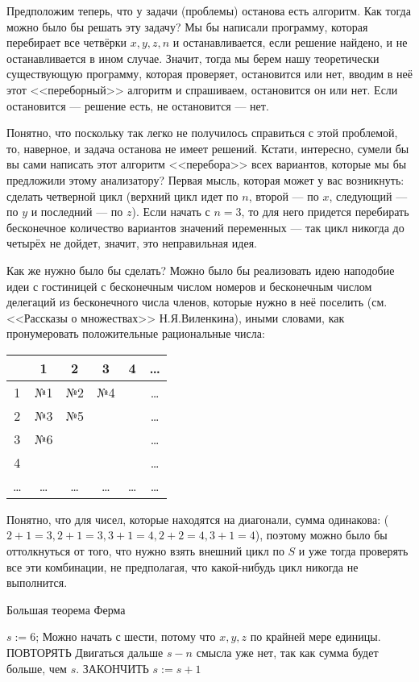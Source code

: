 \documentclass[russian]{lecture-notes}
\begin{document}
	Предположим теперь, что у задачи (проблемы) останова есть алгоритм. Как тогда можно было бы решать эту задачу? Мы бы написали программу, которая перебирает все четвёрки $x, y, z, n$ и останавливается, если решение найдено, и не останавливается в ином случае. Значит, тогда мы берем нашу теоретически существующую программу, которая проверяет, остановится или нет, вводим в неё этот <<переборный>> алгоритм и спрашиваем, остановится он или нет. Если остановится --- решение есть, не остановится --- нет. 
	
	Понятно, что поскольку так легко не получилось справиться с этой проблемой, то, наверное, и задача останова не имеет решений. Кстати, интересно, сумели бы вы сами написать этот алгоритм <<перебора>> всех вариантов, которые мы бы предложили этому анализатору? Первая мысль, которая может у вас возникнуть: сделать четверной цикл (верхний цикл идет по $n$, второй --- по $x$, следующий --- по $y$ и последний --- по $z$). Если начать с $n = 3$, то для него придется перебирать бесконечное количество вариантов значений переменных --- так цикл никогда до четырёх не дойдет, значит, это неправильная идея. 
	
	Как же нужно было бы сделать? Можно было бы реализовать идею наподобие идеи с гостиницей с бесконечным числом номеров и бесконечным числом делегаций из бесконечного числа членов, которые нужно в неё поселить (см. <<Рассказы о множествах>> Н.Я.Виленкина), иными словами, как пронумеровать положительные рациональные числа:
	
	\begin{tabular}{c|c|c|c|c|c}
		& 1 & 2 & 3 & 4 & \ldots \\
		\hline 1 & №1 & №2 & №4 &  &  \ldots \\\hline
		2 & №3 & №5 &  &  &  \ldots \\\hline
		3 & №6 &  &  &  &  \ldots \\\hline
		4 &  &  &  &  &  \ldots \\\hline
		\ldots & \ldots & \ldots & \ldots & \ldots & \ldots
	\end{tabular}
	
	Понятно, что для чисел, которые находятся на диагонали, сумма одинакова: ($2 + 1 = 3, 2 + 1 = 3, 3 + 1 = 4, 2 + 2 = 4, 3 + 1 = 4$), поэтому можно было бы оттолкнуться от того, что нужно взять внешний цикл по $S$ и уже тогда проверять все эти комбинации, не предполагая, что какой-нибудь цикл никогда не выполнится.
	
	
	\begin{algorithm}[H]
		\caption{Большая теорема Ферма}
		\label{alg:one}
		\begin{algorithmic}
			\State $s := 6$; 
			\Comment Можно начать с шести, потому что $x, y, z$ по крайней мере единицы.
			\State ПОВТОРЯТЬ
			\Comment Двигаться дальше $s - n$ смысла уже нет, так как сумма будет больше, чем $s$.
			\State ЗАКОНЧИТЬ
			\Else
			\State $s := s + 1$
			\EndIf
			\EndFor
			\EndFor
			\EndFor
			\EndFor
		\end{algorithmic}
	\end{algorithm}
	
\end{document}

